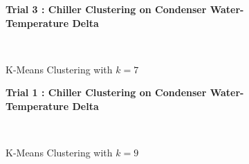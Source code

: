 \begin{figure}[!h]
\centerline{\bfseries\Large Trial 3 : Chiller Clustering on Condenser Water-Temperature Delta}\\
\caption{K-Means Clustering with $k=7$}
\end{figure}
\begin{figure}[!h]
\centerline{\bfseries\Large Trial 1 : Chiller Clustering on Condenser Water-Temperature Delta}\\
\caption{K-Means Clustering with $k=9$}
\end{figure}
